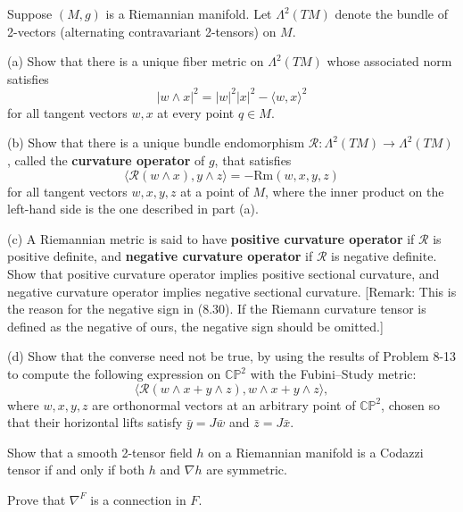 \begin{exercise}
\label{prob:curvature-operator}
Suppose $(M, g)$ is a Riemannian manifold. Let $\Lambda^2(TM)$ denote the bundle of 2-vectors (alternating contravariant 2-tensors) on $M$.

(a) Show that there is a unique fiber metric on $\Lambda^2(TM)$ whose associated norm satisfies
\[
|w \wedge x|^2 = |w|^2|x|^2 - \langle w,x\rangle^2
\]
for all tangent vectors $w, x$ at every point $q \in M$.

(b) Show that there is a unique bundle endomorphism $\mathcal{R}: \Lambda^2(TM) \to \Lambda^2(TM)$, called the \textbf{curvature operator} of $g$, that satisfies
\begin{equation}
\langle \mathcal{R}(w \wedge x), y \wedge z\rangle = -\text{Rm}(w,x,y,z)
\tag{8.30}
\end{equation}
for all tangent vectors $w, x, y, z$ at a point of $M$, where the inner product on the left-hand side is the one described in part (a).

(c) A Riemannian metric is said to have \textbf{positive curvature operator} if $\mathcal{R}$ is positive definite, and \textbf{negative curvature operator} if $\mathcal{R}$ is negative definite. Show that positive curvature operator implies positive sectional curvature, and negative curvature operator implies negative sectional curvature. [Remark: This is the reason for the negative sign in (8.30). If the Riemann curvature tensor is defined as the negative of ours, the negative sign should be omitted.]

(d) Show that the converse need not be true, by using the results of Problem 8-13 to compute the following expression on $\mathbb{CP}^2$ with the Fubini--Study metric:
\[
\langle \mathcal{R}(w \wedge x + y \wedge z), w \wedge x + y \wedge z\rangle,
\]
where $w, x, y, z$ are orthonormal vectors at an arbitrary point of $\mathbb{CP}^2$, chosen so that their horizontal lifts satisfy $\bar{y} = J\bar{w}$ and $\bar{z} = J\bar{x}$.
\end{exercise}


\begin{exercise}
\label{exer:codazzi-tensor-characterization}
Show that a smooth 2-tensor field $h$ on a Riemannian manifold is a Codazzi tensor if and only if both $h$ and $\nabla h$ are symmetric.
\end{exercise}

\begin{exercise}
\label{exer:connection-in-bundle}
Prove that $\nabla^F$ is a connection in $F$.
\end{exercise}

